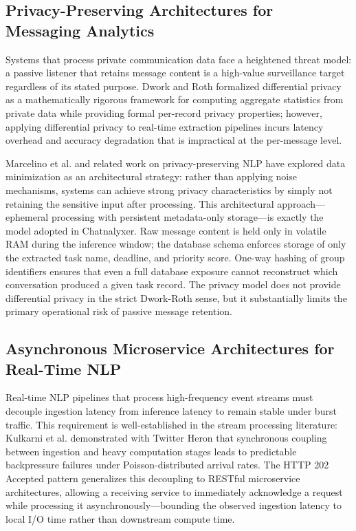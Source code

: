 \subsection{Privacy-Preserving Architectures for Messaging Analytics}

Systems that process private communication data face a heightened threat model: a passive listener that retains message content is a high-value surveillance target regardless of its stated purpose. Dwork and Roth \cite{dwork2014algorithmic} formalized differential privacy as a mathematically rigorous framework for computing aggregate statistics from private data while providing formal per-record privacy properties; however, applying differential privacy to real-time extraction pipelines incurs latency overhead and accuracy degradation that is impractical at the per-message level.

Marcelino et al. \cite{marcelino2021privacy} and related work on privacy-preserving NLP have explored data minimization as an architectural strategy: rather than applying noise mechanisms, systems can achieve strong privacy characteristics by simply not retaining the sensitive input after processing. This architectural approach—ephemeral processing with persistent metadata-only storage—is exactly the model adopted in Chatnalyxer. Raw message content is held only in volatile RAM during the inference window; the database schema enforces storage of only the extracted task name, deadline, and priority score. One-way hashing of group identifiers \cite{boneh2000sok} ensures that even a full database exposure cannot reconstruct which conversation produced a given task record. The privacy model does not provide differential privacy in the strict Dwork-Roth sense, but it substantially limits the primary operational risk of passive message retention.

\subsection{Asynchronous Microservice Architectures for Real-Time NLP}

Real-time NLP pipelines that process high-frequency event streams must decouple ingestion latency from inference latency to remain stable under burst traffic. This requirement is well-established in the stream processing literature: Kulkarni et al. \cite{kulkarni2015twitter} demonstrated with Twitter Heron that synchronous coupling between ingestion and heavy computation stages leads to predictable backpressure failures under Poisson-distributed arrival rates. The HTTP 202 Accepted pattern \cite{fielding2014http} generalizes this decoupling to RESTful microservice architectures, allowing a receiving service to immediately acknowledge a request while processing it asynchronously—bounding the observed ingestion latency to local I/O time rather than downstream compute time.

